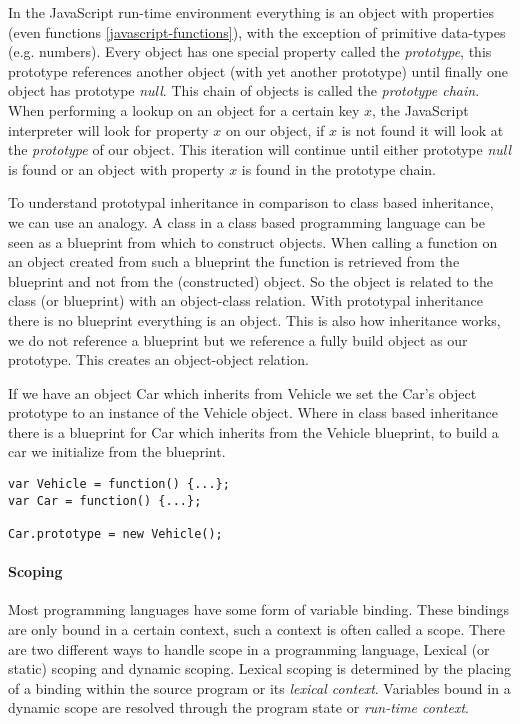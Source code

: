 In the JavaScript run-time environment everything is an object with properties (even functions \ref{javascript-functions}), with the exception of primitive data-types (e.g. numbers). Every object has one special property called the \textit{prototype}, this prototype references another object (with yet another prototype) until finally one object has prototype \textit{null}. This chain of objects is called the \textit{prototype chain}. When performing a lookup on an object for a certain key $x$, the JavaScript interpreter will look for property $x$ on our object, if $x$ is not found it will look at the \textit{prototype} of our object. This iteration will continue until either prototype \textit{null} is found or an object with property $x$ is found in the prototype chain. 

To understand prototypal inheritance in comparison to class based inheritance, we can use an analogy. A class in a class based programming language can be seen as a blueprint from which to construct objects. When calling a function on an object created from such a blueprint the function is retrieved from the blueprint and not from the (constructed) object. So the object is related to the class (or blueprint) with an object-class relation. With prototypal inheritance there is no blueprint everything is an object. This is also how inheritance works, we do not reference a blueprint but we reference a fully build object as our prototype. This creates an object-object relation. 

If we have an object Car which inherits from Vehicle we set the Car's object prototype to an instance of the Vehicle object. Where in class based inheritance there is a blueprint for Car which inherits from the Vehicle blueprint, to build a car we initialize from the blueprint.

\begin{lstlisting}
var Vehicle = function() {...};
var Car = function() {...};

Car.prototype = new Vehicle();
\end{lstlisting}

\paragraph{Scoping} \label{javascript-scoping}
Most programming languages have some form of variable binding. These bindings are only bound in a certain context, such a context is often called a scope. There are two different ways to handle scope in a programming language, Lexical (or static) scoping and dynamic scoping. Lexical scoping is determined by the placing of a binding within the source program or its \textit{lexical context}. Variables bound in a dynamic scope are resolved through the program state or \textit{run-time context}. 

